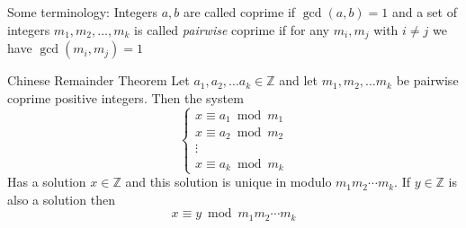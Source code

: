 \documentclass[16pt,a4paper]{article}
\theoremstyle{definition}
\newcommand{\Z}{\mathbb{Z}}
\begin{document}
Some terminology: Integers $a,b$ are called coprime if $\gcd(a,b) = 1$ and a set of integers $m_1,m_2,\ldots,m_k$ is called \emph{pairwise} coprime if for any $m_i,m_j$ with $i\neq j$ we have $\gcd(m_i,m_j) = 1$
\newpage
\begin{thm}{Chinese Remainder Theorem}{}
Let $a_1,a_2, \ldots a_k \in \Z$ and let $m_1,m_2,\ldots m_k$ be pairwise coprime positive integers. Then the system 
\[
\begin{cases}
x\equiv a_1 \bmod m_1 \\
x\equiv a_2 \bmod m_2 \\
\vdots  \\
x\equiv a_k \bmod m_k
\end{cases}
\]
Has a solution $x\in \mathbb{Z}$ and this solution is unique in modulo $m_1m_2\cdots m_k$. If $y\in \Z$ is also a solution then 
\[x\equiv y \bmod m_1m_2\cdots m_k\]
\end{thm}
\end{document}
